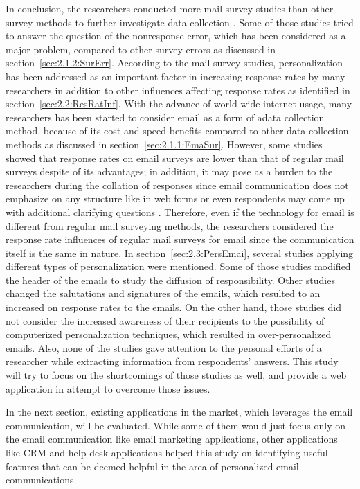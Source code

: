 In conclusion, the researchers conducted more mail survey studies than other survey methods to further investigate data collection \citep{Dillman1991}. Some of those studies tried to answer the question of the nonresponse error, which has been considered as a major problem, compared to other survey errors as discussed in section~\ref{sec:2.1.2:SurErr}. According to the mail survey studies, personalization has been addressed as an important factor in increasing response rates by many researchers in addition to other influences affecting response rates as identified in section~\ref{sec:2.2:ResRatInf}. With the advance of world-wide internet usage, many researchers has been started to consider email as a form of adata collection method, because of its cost and speed benefits compared to other data collection methods as discussed in section~\ref{sec:2.1.1:EmaSur}. However, some studies showed that response rates on email surveys are lower than that of regular mail surveys despite of its advantages; in addition, it may pose as a burden to the researchers during the collation of responses since email communication does not emphasize on any structure like in web forms or even respondents may come up with additional clarifying questions \citep{Selm2006}. Therefore, even if the technology for email is different from regular mail surveying methods, the researchers considered the response rate influences of regular mail surveys for email since the communication itself is the same in nature. In section~\ref{sec:2.3:PersEmai}, several studies applying different types of personalization were mentioned. Some of those studies modified the header of the emails to study the diffusion of responsibility. Other studies changed the salutations and signatures of the emails, which resulted to an increased on response rates to the emails. On the other hand, those studies did not consider the increased awareness of their recipients to the possibility of computerized personalization techniques, which resulted in over-personalized emails. Also, none of the studies gave attention to the personal efforts of a researcher while extracting information from respondents' answers. This study will try to focus on the shortcomings of those studies as well, and provide a web application in attempt to overcome those issues.
\vspace{1cm}

In the next section, existing applications in the market, which leverages the email communication, will be evaluated. While some of them would just focus only on the email communication like email marketing applications, other applications like \ac{CRM} and help desk applications helped this study on identifying useful features that can be deemed helpful in the area of personalized email communications.  


